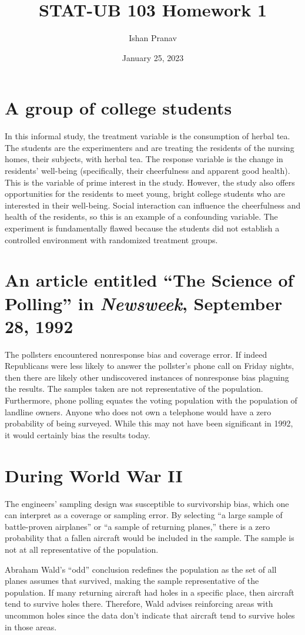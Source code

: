 \documentclass[12pt]{article}
\title{STAT-UB 103 Homework 1}
\author{Ishan Pranav}
\date{January 25, 2023}
\begin{document}
\maketitle
\section{A group of college students}
In this informal study, the treatment variable is the consumption of herbal tea. The students are the experimenters and are treating the residents of the nursing homes, their subjects, with herbal tea. The response variable is the change in residents’ well-being (specifically, their cheerfulness and apparent good health). This is the variable of prime interest in the study. However, the study also offers opportunities for the residents to meet young, bright college students who are interested in their well-being. Social interaction can influence the cheerfulness and health of the residents, so this is an example of a confounding variable. The experiment is fundamentally flawed because the students did not establish a controlled environment with randomized treatment groups. 
\section{An article entitled ``The Science of Polling'' in \emph{Newsweek}, September 28, 1992}
The pollsters encountered nonresponse bias and coverage error. If indeed Republicans were less likely to answer the pollster’s phone call on Friday nights, then there are likely other undiscovered instances of nonresponse bias plaguing the results. The samples taken are not representative of the population. Furthermore, phone polling equates the voting population with the population of landline owners. Anyone who does not own a telephone would have a zero probability of being surveyed. While this may not have been significant in 1992, it would certainly bias the results today.
\section{During World War II}
The engineers' sampling design was susceptible to survivorship bias, which one can interpret as a coverage or sampling error. By selecting ``a large sample of battle-proven airplanes'' or ``a sample of returning planes,'' there is a zero probability that a fallen aircraft would be included in the sample. The sample is not at all representative of the population.

Abraham Wald’s ``odd'' conclusion redefines the population as the set of all planes assumes that survived, making the sample representative of the population. If many returning aircraft had holes in a specific place, then aircraft tend to survive holes there. Therefore, Wald advises reinforcing areas with uncommon holes since the data don't indicate that aircraft tend to survive holes in those areas. 
\end{document}
